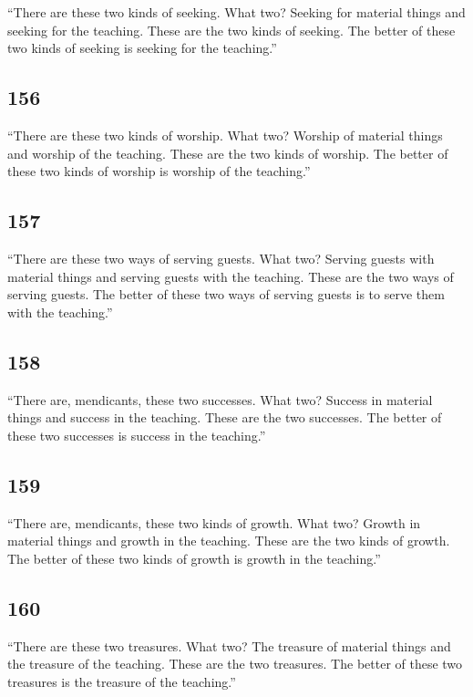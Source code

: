 \documentclass[12pt,openany]{book}%
\begin{document}
“There are these two kinds of seeking. What two? Seeking for material things and seeking for the teaching. These are the two kinds of seeking. The better of these two kinds of seeking is seeking for the teaching.” 

\subsection*{156 }

“There are these two kinds of worship. What two? Worship of material things and worship of the teaching. These are the two kinds of worship. The better of these two kinds of worship is worship of the teaching.” 

\subsection*{157 }

“There are these two ways of serving guests. What two? Serving guests with material things and serving guests with the teaching. These are the two ways of serving guests. The better of these two ways of serving guests is to serve them with the teaching.” 

\subsection*{158 }

“There are, mendicants, these two successes. What two? Success in material things and success in the teaching. These are the two successes. The better of these two successes is success in the teaching.” 

\subsection*{159 }

“There are, mendicants, these two kinds of growth. What two? Growth in material things and growth in the teaching. These are the two kinds of growth. The better of these two kinds of growth is growth in the teaching.” 

\subsection*{160 }

“There are these two treasures. What two? The treasure of material things and the treasure of the teaching. These are the two treasures. The better of these two treasures is the treasure of the teaching.” 
\end{document}
